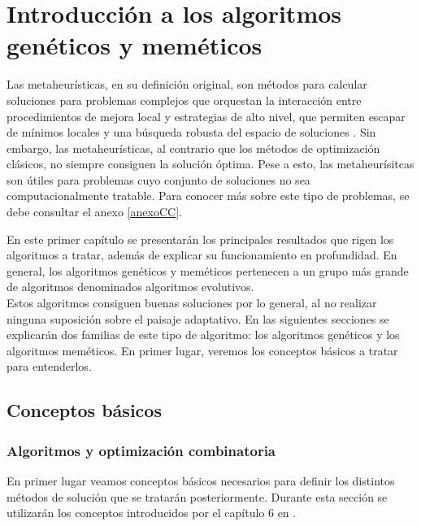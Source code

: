 \chapter{Introducción a los algoritmos genéticos y meméticos} \label{chapter:1}
 Las metaheurísticas, en su definición original, son métodos para calcular soluciones para problemas complejos que orquestan la interacción entre procedimientos de mejora local y estrategias de alto nivel, que permiten escapar de mínimos locales y una búsqueda robusta del espacio de soluciones \cite{metah-hb}. Sin embargo, las metaheurísticas, al contrario que los métodos de optimización clásicos, no siempre consiguen la solución óptima. Pese a esto, las metaheurísitcas son útiles para problemas cuyo conjunto de soluciones no sea computacionalmente tratable. Para conocer más sobre este tipo de problemas, se debe consultar el anexo \ref{anexoCC}.\par
 
En este primer capítulo se presentarán los principales resultados que rigen los algoritmos a tratar, además de explicar su funcionamiento en profundidad. En general, los algoritmos genéticos y meméticos pertenecen a un grupo más grande de algoritmos denominados algoritmos evolutivos.
\\

Estos algoritmos consiguen buenas soluciones por lo general, al no realizar ninguna suposición sobre el paisaje adaptativo. En las siguientes secciones se explicarán dos familias de este tipo de algoritmo: los algoritmos genéticos y los algoritmos meméticos. En primer lugar, veremos los conceptos básicos a tratar para entenderlos.
\section{Conceptos básicos}\label{intro:intro}
\subsection{Algoritmos y optimización combinatoria}
En primer lugar veamos conceptos básicos necesarios para definir los distintos métodos de solución que se tratarán posteriormente. Durante esta sección se utilizarán los conceptos introducidos por el capítulo 6 en \cite{metah-hb}.\\

